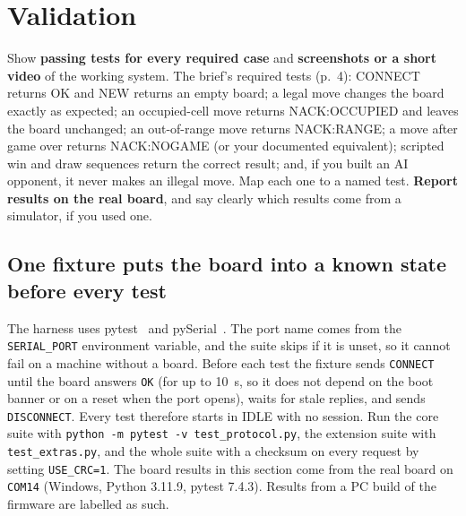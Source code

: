 \section{Validation}
\label{sec:valid}

\begin{guidance}
Show \textbf{passing tests for every required case} and \textbf{screenshots or a
short video} of the working system. The brief's required tests (p.~4):
CONNECT returns OK and NEW returns an empty board; a legal move changes the
board exactly as expected; an occupied-cell move returns NACK:OCCUPIED and
leaves the board unchanged; an out-of-range move returns NACK:RANGE; a move
after game over returns NACK:NOGAME (or your documented equivalent); scripted
win and draw sequences return the correct result; and, if you built an AI
opponent, it never makes an illegal move. Map each one to a named test.
\textbf{Report results on the real board}, and say clearly which results come
from a simulator, if you used one.
\end{guidance}

\subsection{One fixture puts the board into a known state before every test}
The harness uses pytest~\cite{pytest} and pySerial~\cite{pyserial}. The port
name comes from the \texttt{SERIAL\_PORT} environment variable, and the suite
skips if it is unset, so it cannot fail on a machine without a board. Before each
test the fixture sends \texttt{CONNECT} until the board answers \texttt{OK}
(for up to 10~s, so it does not depend on the boot banner or on a reset when the
port opens), waits for stale replies, and sends \texttt{DISCONNECT}. Every test
therefore starts in IDLE with no session. Run the core suite with
\texttt{python -m pytest -v test\_protocol.py}, the extension suite with
\texttt{test\_extras.py}, and the whole suite with a checksum on every request by
setting \texttt{USE\_CRC=1}. The board results in this section come from the real
board on \texttt{COM14} (Windows, Python 3.11.9, pytest 7.4.3). Results from a PC
build of the firmware are labelled as such.

